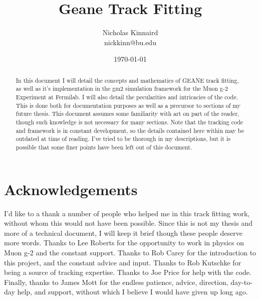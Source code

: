\documentclass{article}
\begin{document}
\title{Geane Track Fitting}
\author{Nicholas Kinnaird \\ nickkinn@bu.edu}
\date{\today}
\maketitle

\begin{abstract}

    In this document I will detail the concepts and mathematics of GEANE track fitting, as well as it's implementation in the gm2 simulation framework for the Muon g-2 Experiment at Fermilab. I will also detail the pecularities and intricacies of the code. This is done both for documentation purposes as well as a precursor to sections of my future thesis. This document assumes some familiarity with art on part of the reader, though such knowledge is not necessary for many sections. Note that the tracking code and framework is in constant development, so the details contained here within may be outdated at time of reading. I've tried to be thorough in my descriptions, but it is possible that some finer points have been left out of this document.

\end{abstract}

\tableofcontents














% 



\printbibliography

\section{Acknowledgements}

	I'd like to a thank a number of people who helped me in this track fitting work, without whom this would not have been possible. Since this is not my thesis and more of a technical document, I will keep it brief though these people deserve more words. Thanks to Lee Roberts for the opportunity to work in physics on Muon g-2 and the constant support. Thanks to Rob Carey for the introduction to this project, and the constant advice and input. Thanks to Rob Kutschke for being a source of tracking expertise. Thanks to Joe Price for help with the code. Finally, thanks to James Mott for the endless patience, advice, direction, day-to-day help, and support, without which I believe I would have given up long ago.




\end{document}
